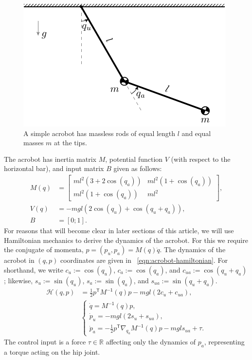 \documentclass[journal,twoside,web]{ieeecolor}
\newcommand*{\tpose}{^\mathsf{T}}
\newcommand*{\R}{\mathbb{R}}
\newcommand*{\Minv}{M^\mathsf{-1}}
\begin{document}
\begin{figure}
    \centering
    \includegraphics[width=0.8\linewidth]{simple_acrobot_model.pdf}
    \caption{A simple acrobot has massless rods of equal length \(l\) and 
    equal masses \(m\) at the tips.}
    \label{fig:simple-acrobot-model}
\end{figure}

The acrobot has inertia matrix 
\(M\), potential function \(V\) (with respect to
the horizontal bar), and input matrix \(B\) given as follows:
\begin{align}\label{eqn:acrobot-inertia}
    M(q) &= \begin{bmatrix}
        ml^2\left(3+2\cos(q_a)\right) & 
        ml^2\left(1+\cos(q_a)\right) \\
        ml^2\left(1+\cos(q_a)\right) &
        ml^2
    \end{bmatrix} 
    , \\
    \label{eqn:acrobot-potential}
    V(q) &= -mgl\left(2\cos(q_u)+\cos(q_u+q_a)\right)
    , \\
    \label{eqn:acrobot-B}
    B &= [0;1]
    .
\end{align}
For reasons that will become clear in later sections of this article, we will
use Hamiltonian mechanics to derive the dynamics of the acrobot. 
For this we require the conjugate of momenta, \(p = (p_u,p_a) = M(q)\dot{q}\).
The dynamics of the acrobot in \((q,p)\) coordinates are given in
~\eqref{eqn:acrobot-hamiltonian}.
For shorthand, we write \(c_u := \cos(q_u)\), \(c_a := \cos(q_a)\), and 
\(c_{ua} := \cos(q_u + q_a)\); likewise, \(s_u := \sin(q_u)\), 
\(s_a := \sin(q_a)\), and \(s_{ua} := \sin(q_u + q_a)\).
\begin{align}\label{eqn:acrobot-hamiltonian}
    \mathcal{H}(q,p) &= \frac{1}{2}p\tpose \Minv(q) p -
    mgl\left(2 c_u + c_{ua}\right)
    , \\
     &\begin{cases}
        \dot{q} = \Minv(q) p 
        ,\\
        \dot{p}_u = -mgl\left(2s_u + s_{ua}\right) 
        ,\\
        \dot{p}_a =-\frac{1}{2}p\tpose \nabla_{q_a}\Minv(q) p
        - mgl s_{ua} + \tau.
    \end{cases} \nonumber
\end{align}
The control input is a force \(\tau \in \R\) affecting only the dynamics of
\(p_a\), representing a torque acting on the hip joint.
\end{document}
